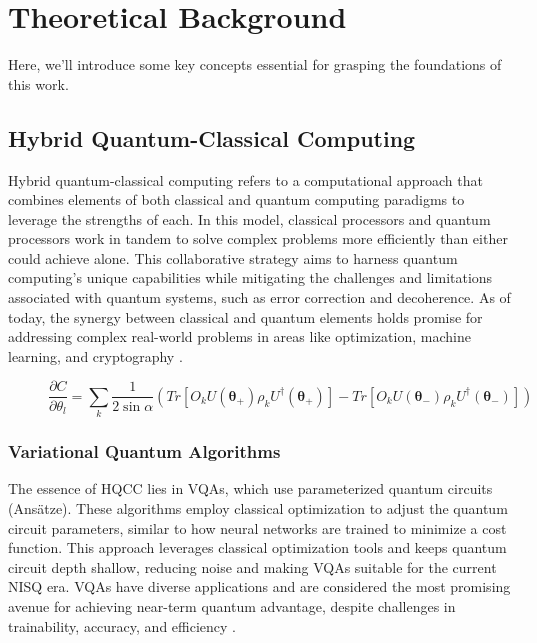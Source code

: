 

\section{Theoretical Background}
\label{sec: backg}

Here, we'll introduce some key concepts essential for grasping the foundations of this work.


\subsection{Hybrid Quantum-Classical Computing}
\label{sec: HQCC}
Hybrid quantum-classical computing refers to a computational approach that combines elements of both classical and quantum computing paradigms to leverage the strengths of each. In this model, classical processors and quantum processors work in tandem to solve complex problems more efficiently than either could achieve alone. This collaborative strategy aims to harness quantum computing's unique capabilities while mitigating the challenges and limitations associated with quantum systems, such as error correction and decoherence. As of today, the synergy between classical and quantum elements holds promise for addressing complex real-world problems in areas like optimization, machine learning, and cryptography \cite{Cerezo_2021}.

\begin{figure}[b]
    \centering
    \begin{equation}\label{eq:param_shift}\tag{3}
        \frac{\partial C}{\partial \theta_l} = \sum_k \frac{1}{2\sin{\alpha}}\left(Tr\left[O_k U(\boldsymbol{\theta_+}) \rho_k U^{\dagger}(\boldsymbol{\theta_+})\right] - Tr\left[O_k U(\boldsymbol{\theta_-}) \rho_k U^{\dagger}(\boldsymbol{\theta_-})\right]\right)
    \end{equation}
\end{figure}

\subsubsection{Variational Quantum Algorithms}
The essence of HQCC lies in VQAs, which use parameterized quantum circuits (Ansätze). These algorithms employ classical optimization to adjust the quantum circuit parameters, similar to how neural networks are trained to minimize a cost function. This approach leverages classical optimization tools and keeps quantum circuit depth shallow, reducing noise and making VQAs suitable for the current NISQ era. VQAs have diverse applications and are considered the most promising avenue for achieving near-term quantum advantage, despite challenges in trainability, accuracy, and efficiency \cite{Cerezo_2021}.

